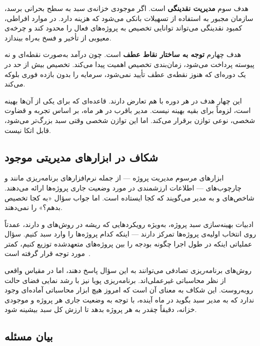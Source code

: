 هدف سوم \textbf{مدیریت نقدینگی} است. اگر موجودی خزانه‌ی سبد به سطح
بحرانی برسد، سازمان مجبور به استفاده از تسهیلات بانکی می‌شود که هزینه
دارد. در موارد افراطی، کمبود نقدینگی می‌تواند توانایی تخصیص به
پروژه‌های فعال را محدود کند و چرخه‌ی معیوبی از تأخیر و فسخ به‌راه بیندازد.

هدف چهارم \textbf{توجه به ساختار نقاط عطف} است. چون درآمد به‌صورت
نقطه‌ای و نه پیوسته پرداخت می‌شود، زمان‌بندی تخصیص اهمیت پیدا می‌کند.
تخصیص بیش از حد در یک دوره‌ای که هنوز نقطه‌ی عطف تأیید نمی‌شود،
سرمایه را بدون بازده فوری بلوکه می‌کند.

این چهار هدف در هر دوره با هم تعارض دارند. قاعده‌ای که برای یکی از
آن‌ها بهینه است، لزوماً برای بقیه بهینه نیست. مدیر باقرب در هر ماه،
بر اساس تجربه و قضاوت شخصی، نوعی توازن برقرار می‌کند. اما این توازن
شخصی وقتی سبد بزرگ‌تر می‌شود، قابل اتکا نیست.

\subsection{شکاف در ابزارهای مدیریتی موجود}

ابزارهای مرسوم مدیریت پروژه — از جمله نرم‌افزارهای برنامه‌ریزی مانند
 و چارچوب‌های 
— اطلاعات ارزشمندی در مورد وضعیت جاری پروژه‌ها ارائه می‌دهند. شاخص‌های
 و 
به مدیر می‌گویند که کجا ایستاده است. اما جواب سؤال «به کجا تخصیص بدهم؟»
را نمی‌دهند.

ادبیات بهینه‌سازی سبد پروژه، به‌ویژه رویکردهایی که ریشه در روش‌های
 و
 دارند، عمدتاً روی انتخاب اولیه‌ی پروژه‌ها
تمرکز دارند — اینکه کدام پروژه‌ها را وارد سبد کنیم. سؤال عملیاتی اینکه
در طول اجرا چگونه بودجه را بین پروژه‌های متعهدشده توزیع کنیم، کمتر مورد
توجه قرار گرفته است~\citep{Archer1999}.

روش‌های برنامه‌ریزی تصادفی می‌توانند به این سؤال پاسخ دهند، اما در
مقیاس واقعی از نظر محاسباتی غیرعملی‌اند. برنامه‌ریزی پویا نیز با رشد
نمایی فضای حالت روبه‌روست. این شکاف به معنای آن است که امروز هیچ ابزار
محاسباتی آماده‌ای وجود ندارد که به مدیر سبد بگوید در ماه آینده، با
توجه به وضعیت جاری هر پروژه و موجودی خزانه، دقیقاً چقدر به هر پروژه
بدهد تا ارزش کل سبد بیشینه شود.

\subsection{بیان مسئله}
\label{subsec:management_problem_statement}

